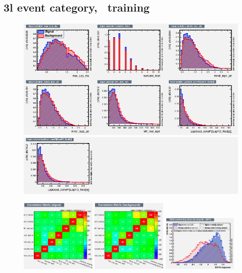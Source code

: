 \clearpage

\subsection*{3l event category, \ttV\ training}
\begin{figure}[htb]
 \centering
 \includegraphics[width=\textwidth]{plots_extraction/training/train_3l_ttv/variables_id_c1}\\
 \includegraphics[width=\textwidth]{plots_extraction/training/train_3l_ttv/variables_id_c2}\\
\end{figure}
\begin{figure}[htb]
 \includegraphics[width=0.32\textwidth]{plots_extraction/training/train_3l_ttv/CorrelationMatrixS}
 \includegraphics[width=0.32\textwidth]{plots_extraction/training/train_3l_ttv/CorrelationMatrixB}
 \includegraphics[width=0.32\textwidth]{plots_extraction/training/train_3l_ttv/overtrain_BDTG.png}
\end{figure}

\clearpage

